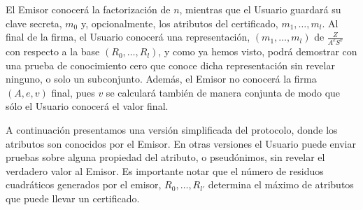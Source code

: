 El Emisor conocerá la factorización de $n$, mientras que el Usuario guardará su clave secreta, $m_0$ y, opcionalmente, los atributos del certificado, $m_1,\dots,m_l$. Al final de la firma, el Usuario conocerá una representación, $(m_1,\dots,m_l)$ de $\frac{Z}{A^eS^v}$ con respecto a la base $(R_0,\dots,R_l)$, y como ya hemos visto, podrá demostrar con una prueba de conocimiento cero que conoce dicha representación sin revelar ninguno, o solo un subconjunto. Además, el Emisor no conocerá la firma $(A,e,v)$ final, pues $v$ se calculará también de manera conjunta de modo que sólo el Usuario conocerá el valor final.

\hfil

A continuación presentamos una versión simplificada del protocolo, donde los atributos son conocidos por el Emisor. En otras versiones el Usuario puede enviar pruebas sobre alguna propiedad del atributo, o pseudónimos, sin revelar el verdadero valor al Emisor. Es importante notar que el número de residuos cuadráticos generados por el emisor, $R_0,\dots,R_{l'}$ determina el máximo de atributos que puede llevar un certificado.

